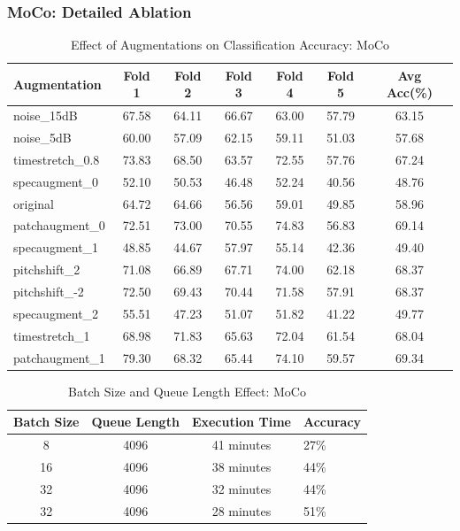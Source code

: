 \documentclass[11pt]{article}
\begin{document}
\subsubsection{MoCo: Detailed Ablation}
\begin{table}[ht]
    \centering
    \begin{tabular}{lcccccc}
    \toprule
    \textbf{Augmentation} & \textbf{Fold 1} & \textbf{Fold 2} & \textbf{Fold 3} & \textbf{Fold 4} & \textbf{Fold 5} & \textbf{Avg Acc(\%)} \\
    \midrule
    noise\_15dB & 67.58 & 64.11 & 66.67 & 63.00 & 57.79 & 63.15 \\
    noise\_5dB & 60.00 & 57.09 & 62.15 & 59.11 & 51.03 & 57.68 \\
    timestretch\_0.8 & 73.83 & 68.50 & 63.57 & 72.55 & 57.76 & 67.24 \\
    specaugment\_0 & 52.10 & 50.53 & 46.48 & 52.24 & 40.56 & 48.76 \\
    original & 64.72 & 64.66 & 56.56 & 59.01 & 49.85 & 58.96 \\
    patchaugment\_0 & 72.51 & 73.00 & 70.55 & 74.83 & 56.83 & 69.14 \\
    specaugment\_1 & 48.85 & 44.67 & 57.97 & 55.14 & 42.36 & 49.40 \\
    pitchshift\_2 & 71.08 & 66.89 & 67.71 & 74.00 & 62.18 & 68.37 \\
    pitchshift\_-2 & 72.50 & 69.43 & 70.44 & 71.58 & 57.91 & 68.37 \\
    specaugment\_2 & 55.51 & 47.23 & 51.07 & 51.82 & 41.22 & 49.77 \\
    timestretch\_1 & 68.98 & 71.83 & 65.63 & 72.04 & 61.54 & 68.04 \\
    patchaugment\_1 & 79.30 & 68.32 & 65.44 & 74.10 & 59.57 & 69.34 \\
    \bottomrule
    \end{tabular}
    \caption{Effect of Augmentations on Classification Accuracy: MoCo}
\end{table}
\begin{table}[ht]
    \centering
    \begin{tabular}{cccl}
    \toprule
    \textbf{Batch Size}& \textbf{Queue Length}& \textbf{Execution Time}&\textbf{Accuracy}\\
    \midrule
    8& 4096& 41 minutes&27\%\\
    16& 4096& 38 minutes&44\%\\
    32& 4096& 32 minutes&44\%\\
    32& 4096& 28 minutes&51\%\\
    \end{tabular}
    \caption{Batch Size and Queue Length Effect: MoCo}
\end{table}
\end{document}
